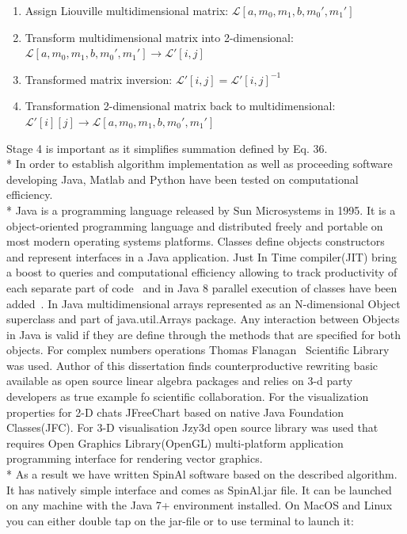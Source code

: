 \begin{center}
\begin{enumerate}
\item Assign Liouville multidimensional matrix: $\mathcal{L}[a,m_0,m_1,b,m_0',m_1']$
\item Transform multidimensional matrix into 2-dimensional: $\mathcal{L}[a,m_0,m_1,b,m_0',m_1'] \rightarrow \mathcal{L}'[i,j]$ 
\item Transformed matrix inversion: $\mathcal{L}'[i,j]=\mathcal{L}'[i,j]^{-1}$
\item Transformation 2-dimensional matrix back to multidimensional: \\ $\mathcal{L}'[i][j]\rightarrow \mathcal{L}[a,m_0,m_1,b,m_0',m_1']$ 
\end{enumerate}   
\end{center}    
Stage 4 is important as it simplifies summation defined by Eq. 36. \\*
In order to establish algorithm implementation as well as proceeding software developing Java, Matlab and Python have been tested on computational efficiency. \\*
Java is  a programming language released by Sun Microsystems in 1995. It is a object-oriented programming language and distributed freely and portable on most modern operating systems platforms. Classes define objects constructors and represent interfaces in a Java application. Just In Time compiler(JIT) bring a boost to queries and computational efficiency allowing to track productivity of each separate part of code~\cite{hortell} and in Java 8 parallel execution of classes have been added~\cite{javapal}. In Java multidimensional arrays represented as an N-dimensional Object superclass and part of java.util.Arrays package. Any interaction between Objects in Java is valid if they are define through the methods that are specified for both objects. For complex numbers operations Thomas Flanagan~\cite{flanagan} Scientific Library was used. Author of this dissertation finds counterproductive rewriting basic available as open source linear algebra packages and relies on 3-d party developers as true example fo scientific collaboration. For the visualization properties for 2-D chats JFreeChart based on native Java Foundation Classes(JFC). For 3-D visualisation Jzy3d open source library was used that requires Open Graphics Library(OpenGL)  multi-platform application programming interface for rendering vector graphics.\\*
As a result we have written SpinAl software based on the described algorithm. It has natively simple interface and comes as SpinAl.jar file. It can be launched on any machine with the Java 7+ environment installed. On MacOS and Linux you can either double tap on the jar-file or to use terminal to launch it:
